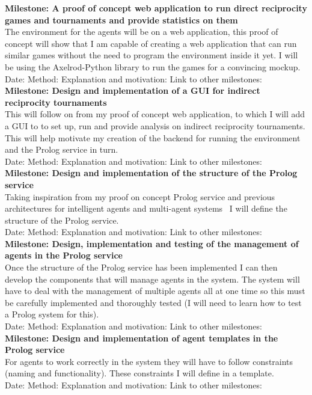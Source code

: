 \documentclass{article}
\begin{document}
\noindent\textbf{Milestone: A proof of concept web application to run direct reciprocity games and tournaments and provide statistics on them}\\
The environment for the agents will be on a web application, this proof of concept will show that I am capable of creating a web application that can run similar games without the need to program the environment inside it yet. I will be using the Axelrod-Python library to run the games for a convincing mockup.\\
Date:
Method: 
Explanation and motivation:
Link to other milestones:\\

\noindent\textbf{Milestone: Design and implementation of a GUI for indirect reciprocity tournaments}\\
This will follow on from my proof of concept web application, to which I will add a GUI to to set up, run and provide analysis on indirect reciprocity tournaments. This will help motivate my creation of the backend for running the environment and the Prolog service in turn.\\
Date:
Method: 
Explanation and motivation:
Link to other milestones:\\

\noindent\textbf{Milestone: Design and implementation of the structure of the Prolog service}\\
Taking inspiration from my proof on concept Prolog service and previous architectures for intelligent agents and multi-agent systems~\cite{prosocs} I will define the structure of the Prolog service.\\
Date:
Method: 
Explanation and motivation:
Link to other milestones:\\

\noindent\textbf{Milestone: Design, implementation and testing of the management of agents in the Prolog service}\\
Once the structure of the Prolog service has been implemented I can then develop the components that will manage agents in the system. The system will have to deal with the management of multiple agents all at one time so this must be carefully implemented and thoroughly tested (I will need to learn how to test a Prolog system for this).\\
Date:
Method: 
Explanation and motivation:
Link to other milestones:\\

\noindent\textbf{Milestone: Design and implementation of agent templates in the Prolog service}\\
For agents to work correctly in the system they will have to follow constraints (naming and functionality). These constraints I will define in a template.\\
Date:
Method: 
Explanation and motivation:
Link to other milestones:\\
\end{document}
